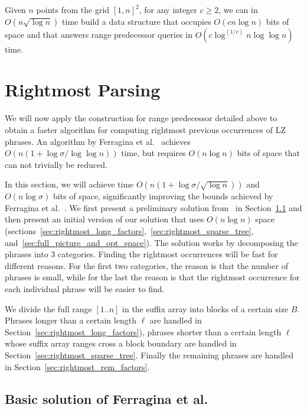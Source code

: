 \documentclass[11pt,runningheads]{llncs}
\begin{document}
\begin{corollary}
\label{range_pred_corollary}
Given $n$ points from the grid $[1,n]^2$, for any integer $c\geq 2$, 
we can in $O(n\sqrt{\log n})$ time build a data structure that occupies 
$O(cn\log n)$ bits of space and that answers 
range predecessor 
queries in $O(c\log^{(1/c)} n\log\log n)$ time. 

\end{corollary}


\section{Rightmost Parsing}
\label{sec-rightmost}

We will now apply the construction for range predecessor detailed above 
to obtain a faster algorithm for computing rightmost previous occurrences 
of LZ phrases. An algorithm by Ferragina et al.~\cite{fnv2013} achieves 
$O(n(1 + \log\sigma/\log\log n))$ time, but requires $O(n\log n)$ bits 
of space that can not trivially be reduced.

In this section, we will achieve time $O(n(1 + \log\sigma/\sqrt{\log n}))$
and $O(n\log\sigma)$ bits of space, significantly improving the bounds 
achieved by Ferragina et al.~\cite{fnv2013}. We first present a preliminary 
solution from~\cite{fnv2013} in Section~\ref{sec:basic_rightmost} and then present an initial version of our 
solution that uses $O(n\log n)$ space (sections~\ref{sec:rightmost_long_factors},~\ref{sec:rightmost_sparse_tree}, and~\ref{sec:full_picture_and_opt_space}). 
The solution works by decomposing the phrases into $3$ categories. 
Finding the rightmost occurrences will be fast 
for different reasons. For the first two categories, the reason 
is that the number of phrases is small, while for the last the reason 
is that the rightmost occurrence for each individual phrase will be easier 
to find. 

We divide the full range $[1..n]$ in the suffix array into blocks of a certain size $B$. 
Phrases longer than 
a certain length $\ell$  are handled in Section~\ref{sec:rightmost_long_factors}), phrases 
shorter than a certain length $\ell$ whose suffix array ranges cross a block boundary
are handled in Section~\ref{sec:rightmost_sparse_tree}. Finally the remaining phrases are handled 
in Section~\ref{sec:rightmost_rem_factors}. 

\subsection{Basic solution of Ferragina et al.}
\label{sec:basic_rightmost}
\end{document}
